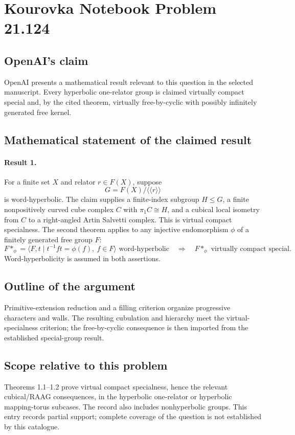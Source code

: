 \documentclass[11pt]{article}
\begin{document}
\section*{Kourovka Notebook Problem 21.124}

\subsection{OpenAI's claim}
OpenAI presents a mathematical result relevant to this question in the selected manuscript. Every hyperbolic one-relator group is claimed virtually compact special and, by the cited theorem, virtually free-by-cyclic with possibly infinitely generated free kernel.

\subsection{Mathematical statement of the claimed result}
\paragraph{Result 1.} For a finite set \(X\) and relator \(r\in F(X)\), suppose
\[
 G=F(X)/\langle\!\langle r\rangle\!\rangle
\]
is word-hyperbolic. The claim supplies a finite-index subgroup \(H\le G\), a finite nonpositively curved cube complex \(C\) with \(\pi_1C\cong H\), and a cubical local isometry from \(C\) to a right-angled Artin Salvetti complex. This is virtual compact specialness. The second theorem applies to any injective endomorphism \(\phi\) of a finitely generated free group \(F\):
\[
 F*_{\phi}=\langle F,t\mid t^{-1}ft=\phi(f),\ f\in F\rangle
 \text{ word-hyperbolic}\quad\Longrightarrow\quad F*_{\phi}\text{ virtually compact special}.
\]
Word-hyperbolicity is assumed in both assertions.

\subsection{Outline of the argument}
Primitive-extension reduction and a filling criterion organize progressive characters and walls. The resulting cubulation and hierarchy meet the virtual-specialness criterion; the free-by-cyclic consequence is then imported from the established special-group result.

\subsection{Scope relative to this problem}
Theorems 1.1–1.2 prove virtual compact specialness, hence the relevant cubical/RAAG consequences, in the hyperbolic one-relator or hyperbolic mapping-torus subcases. The record also includes nonhyperbolic groups. This entry records partial support; complete coverage of the question is not established by this catalogue.
\end{document}
